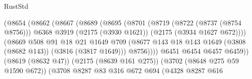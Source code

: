 \begin{lexlean}{RustStd}
\begin{coremodule}
                                            (@8654
                                              (@8662
                                                (@8667
                                                  (@8689
                                                    (@8695
                                                      (@8701
                                                        (@8719
                                                          (@8722 (@8737 (@8754 @8756)))
                                                          @6368
                                                          @3919
                                                          (@2175 (@3930 @1621))
                                                          (@2175 (@3934 @1627 @672))))
                                                      (@8669
                                                        @508
                                                        @91
                                                        @18
                                                        @21
                                                        @1649
                                                        @709
                                                        (@8677
                                                          @143
                                                          @18
                                                          @143
                                                          @1649
                                                          (@3808 (@8682 @143))
                                                          (@3816 (@3817 @1649)))
                                                        @8756))))
                                                @6451
                                                @6454
                                                @6457
                                                @6459))
                                            (@8619 (@8632 @47))
                                            (@2175 (@8639 @161 @275))
                                            (@3702 (@8648 @275 @59 @1590 @672))
                                            (@3708
                                              @8287
                                              @83
                                              @316
                                              @672
                                              @694
                                              (@4328
                                                @8287
                                                @616

\end{coremodule}
\end{lexlean}
